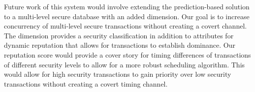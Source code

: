 Future work of this system would involve extending the prediction-based solution to a multi-level secure database with an added dimension. Our goal is to increase concurrency of multi-level secure transactions without creating a covert channel. The dimension provides a security classification in addition to attributes for dynamic reputation that allows for transactions to establish dominance. Our reputation score would provide a cover story for timing differences of transactions of different security levels to allow for a more robust scheduling algorithm. This would allow for high security transactions to gain priority over low security transactions without creating a covert timing channel.

